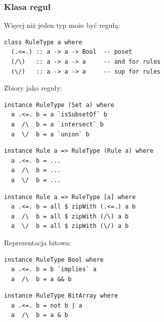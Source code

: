 \documentclass[8pt]{beamer}
\begin{document}
\begin{frame}[fragile]
  \frametitle{Klasa reguł}
  Więcej niż jeden typ może być regułą:
\begin{verbatim}
class RuleType a where
  (.<=.) :: a -> a -> Bool  -- poset
  (/\)   :: a -> a -> a     -- and for rules
  (\/)   :: a -> a -> a     -- sup for rules
\end{verbatim}

  \pause
  Zbiory jako reguły:
\begin{verbatim}
instance RuleType (Set a) where
  a .<=. b = a `isSubsetOf` b
  a  /\  b = a `intersect` b
  a  \/  b = a `union` b
\end{verbatim}

  \pause
\begin{verbatim}
instance Rule a => RuleType (Rule a) where
  a .<=. b = ...
  a  /\  b = ...
  a  \/  b = ...
\end{verbatim}
  \pause
\begin{verbatim}
instance Rule a => RuleType [a] where
  a .<=. b = all $ zipWith (.<=.) a b
  a  /\  b = all $ zipWith (/\) a b
  a  \/  b = all $ zipWith (\/) a b
\end{verbatim}

  \pause
Reprezentacja bitowa:

\begin{verbatim}
instance RuleType Bool where
  a .<=. b = b `implies` a
  a  /\  b = a && b
\end{verbatim}
\pause
\begin{verbatim}
instance RuleType BitArray where
  a .<=. b = not b | a
  a  /\  b = a & b
\end{verbatim}
\end{frame}
\end{document}
